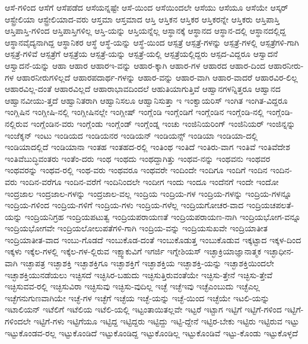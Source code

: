 {ಆಸೆ-ಗಳಿಂದ
ಆಸೆಗೆ
ಆಸೆಪಡೆದ
ಆಸೆಯನ್ನಷ್ಟೇ
ಆಸೆ-ಯಿಂದ
ಆಸೆಯಿಂದಲೇ
ಆಸೆಯು
ಆಸೆಯೂ
ಆಸೆಯೇ
ಆಸ್ಕರ್
ಆಸ್ಟ್ರೇಲಿಯಾ
ಆಸ್ಟ್ರೇಲಿಯಾದ-ವರು
ಆಸ್ತಮಾ
ಆಸ್ತಮಾದ
ಆಸ್ತಿ
ಆಸ್ತಿಕನ
ಆಸ್ತಿಕರ
ಆಸ್ತಿಕರನ್ನೇ
ಆಸ್ತಿಕರು
ಆಸ್ತಿಪಾಸ್ತಿ
ಆಸ್ತಿಪಾಸ್ತಿ-ಗಳಿಂದ
ಆಸ್ತಿಪಾಸ್ತಿಗಳಿಲ್ಲ
ಆಸ್ತಿ-ಯನ್ನು
ಆಸ್ತಿಯನ್ನೆಲ್ಲ
ಆಸ್ಥಾನಕ್ಕೆ
ಆಸ್ಥಾನದ
ಆಸ್ಥಾನ-ದಲ್ಲಿ
ಆಸ್ಥಾನದಲ್ಲಿದ್ದ
ಆಸ್ಥಾನವೈದ್ಯನಾಗಿದ್ದ
ಆಸ್ಥಾನಿಕರ
ಆಸ್ಥೆ
ಆಸ್ಥೆ-ಯನ್ನು
ಆಸ್ಥೆ-ಯಿಂದ
ಆಸ್ಪತ್ರೆ
ಆಸ್ಪತ್ರೆ-ಗಳನ್ನು
ಆಸ್ಪತ್ರೆ-ಗಳಲ್ಲಿ
ಆಸ್ಪತ್ರೆಗಳಿ-ಗಾಗಿ
ಆಸ್ಪತ್ರೆ-ಗಳಿವೆ
ಆಸ್ಪತ್ರೆಗೆ
ಆಸ್ಪತ್ರೆಯ
ಆಸ್ಪತ್ರೆ-ಯನ್ನು
ಆಸ್ಪತ್ರೆ-ಯಲ್ಲಿ
ಆಸ್ಪತ್ರೆಯಲ್ಲಿದ್ದರು
ಆಸ್ಪದ-ವಿದ್ದರೂ
ಆಸ್ವಾದನೆ
ಆಸ್ವಾದನೆ-ಯನ್ನು
ಆಹಾ
ಆಹಾರ
ಆಹಾರಇ-ವನ್ನು
ಆಹಾರ-ಕ್ಕಾಗಿ
ಆಹಾರ-ಗಳ
ಆಹಾರದ
ಆಹಾರ-ದಿಂದ
ಆಹಾರನೀರು-ಗಳ
ಆಹಾರನೀರುಗಳಿಲ್ಲದೆ
ಆಹಾರಪದಾರ್ಥ-ಗಳನ್ನು
ಆಹಾರ-ವನ್ನು
ಆಹಾರ-ವಾಗಿ
ಆಹಾರ-ವಾದರೆ
ಆಹಾರವಿರ-ಲಿಲ್ಲ
ಆಹಾರವಿಲ್ಲ-ದಂತೆ
ಆಹಾರವಿಲ್ಲದೆ
ಆಹಾರಾಭಾವದಿಂದಲೆ
ಆಹುತಿಯಾಗುತ್ತಿವೆ
ಆಹ್ವಾನಗಳನ್ನಿತ್ತರೂ
ಆಹ್ವಾನದ
ಆಹ್ವಾನವೀಯು-ತ್ತದೆ
ಆಹ್ವಾನಿತರಾಗಿ
ಆಹ್ವಾನಿಸಲೂ
ಆಹ್ವಾನಿಸುತ್ತಾ
ಇ
ಇಂಕ್ವಾಯರಿಸ್
ಇಂಗಿತ
ಇಂಗಿತ-ವಿದ್ದರೂ
ಇಂಗ್ಲಿಷಿನ
ಇಂಗ್ಲೀಷಿ-ನಲ್ಲಿ
ಇಂಗ್ಲೀಷಿನಲ್ಲೇ
ಇಂಗ್ಲೀಷ್
ಇಂಗ್ಲೆಂಡಿ
ಇಂಗ್ಲೆಂಡಿಗೆ
ಇಂಗ್ಲೆಂಡಿನ
ಇಂಗ್ಲೆಂಡಿ-ನಲ್ಲಿ
ಇಂಗ್ಲೆಂಡಿ-ನಲ್ಲಿರುವ
ಇಂಗ್ಲೆಂಡಿನ-ವರು
ಇಂಗ್ಲೆಂಡು
ಇಂಗ್ಲೆಂಡ್
ಇಂಗ್ಲೆಂಡ್ನ
ಇಂಚು
ಇಂಜಿನಿಯರಿಂಗ್
ಇಂಜಿನಿಯರ್
ಇಂಜಿನ್ನನ್ನು
ಇಂಜೆಕ್ಶನ್
ಇಂಟು
ಇಂಡಿಯದ
ಇಂಡಿಯನರ
ಇಂಡಿಯನ್
ಇಂಡಿಯನ್ಸ್
ಇಂಡಿಯಾ
ಇಂಡಿಯಾ-ದಲ್ಲಿ
ಇಂಡಿಯಾದಲ್ಲಿದೆ
ಇಂಡಿಯಾನಾ
ಇಂತಹ
ಇಂತಹದ-ರಲ್ಲಿ
ಇಂತಿಂಥ
ಇಂತಿದೆ
ಇಂತಿರು-ವಾಗ
ಇಂತಿವೆ
ಇಂತಿವೆದೇಶ
ಇಂತಿವೆಬುದ್ಧಿವಂತರು
ಇಂತೆಂ-ದರು
ಇಂಥ
ಇಂಥದು
ಇಂಥದ್ದಾಗಿತ್ತು
ಇಂಥವ-ನನ್ನು
ಇಂಥವನು
ಇಂಥವರ
ಇಂಥವರನ್ನು
ಇಂಥವ-ರಲ್ಲಿ
ಇಂಥ-ವರು
ಇಂಥವರೂ
ಇಂಥವರೇ
ಇಂದಿಂದೇ
ಇಂದಿಗೂ
ಇಂದಿಗೆ
ಇಂದಿನ
ಇಂದಿನ-ವರು
ಇಂದಿನ-ವರೆಗೂ
ಇಂದಿನ-ವರೆಗೆ
ಇಂದಿನಿಂದಲೇ
ಇಂದೀಗ
ಇಂದು
ಇಂದೂ
ಇಂದೆನಗೆ
ಇಂದೇ
ಇಂದೋ
ಇಂದ್ರಜಾಲ
ಇಂದ್ರಜಾಲ-ಗಳನ್ನು
ಇಂದ್ರಜಾಲ-ವಲ್ಲ
ಇಂದ್ರಿಯ
ಇಂದ್ರಿಯ-ಗಳ
ಇಂದ್ರಿಯ-ಗಳನ್ನು
ಇಂದ್ರಿಯ-ಗಳನ್ನೂ
ಇಂದ್ರಿಯ-ಗಳಿಂದ
ಇಂದ್ರಿಯ-ಗಳಿಗೆ
ಇಂದ್ರಿಯ-ಗಳು
ಇಂದ್ರಿಯ-ಗಳೆಲ್ಲ
ಇಂದ್ರಿಯಗೋಚರ-ವಾದ
ಇಂದ್ರಿಯಚಪಲತೆ-ಯನ್ನು
ಇಂದ್ರಿಯನಿಗ್ರಹ
ಇಂದ್ರಿಯಪಟುತ್ವ
ಇಂದ್ರಿಯಪರಾಯಣತೆ
ಇಂದ್ರಿಯಪರಾಯಣ-ನಾಗಿ
ಇಂದ್ರಿಯಭೋಗ-ವನ್ನೂ
ಇಂದ್ರಿಯಭೋಗವೇ
ಇಂದ್ರಿಯಲೋಲುಪತೆಗಳಿ-ಗಾಗಿ
ಇಂದ್ರಿಯ-ವನ್ನು
ಇಂದ್ರಿಯಸುಖವೇ
ಇಂದ್ರಿಯಾತೀತ
ಇಂದ್ರಿಯಾತೀತ-ವಾದ
ಇಂಬು-ಗೊಡದೆ
ಇಂಬುಕೊಡ-ದಂತೆ
ಇಂಬುಕೊಡುತ್ತ
ಇಂಬುಕೊಡುವ
ಇಕ್ಕಟ್ಟಾದ
ಇಕ್ಕಳ-ದಿಂದ
ಇಕ್ಕಳು
ಇಕ್ಕೆಲ-ಗಳಲ್ಲಿ
ಇಕ್ಕೆಲ-ಗಳ-ಲ್ಲಿರುವ
ಇಕ್ಷ್ವಾಕುವಿಗೆ
ಇಗರ್ಜಿ
ಇಗ್ನೇಶಿಯಸ್
ಇಚ್ಛಾಕ್ರಿಯಾಜ್ಞಾನಾತ್ಮಕ
ಇಚ್ಛಾಧೀನ-ವಾಗಿ
ಇಚ್ಛಾಪತ್ರ
ಇಚ್ಛಾಶಕ್ತಿ
ಇಚ್ಛಾಶಕ್ತಿಗೂ
ಇಚ್ಛಾಶಕ್ತಿಗೆ
ಇಚ್ಛಾಶಕ್ತಿಯ
ಇಚ್ಛಾಶಕ್ತಿ-ಯನ್ನು
ಇಚ್ಛಾಶಕ್ತಿಯಿಂದಲೇ
ಇಚ್ಛಾಶಕ್ತಿಯುನಡೆಯಲು
ಇಚ್ಛಿಸದೆ
ಇಚ್ಛಿಸಿರ-ಬಹುದು
ಇಚ್ಛಿಸುತ್ತಿರುವಂತೆಯೇ
ಇಚ್ಛಿಸು-ತ್ತೇನೆ
ಇಚ್ಛಿಸು-ತ್ತೇವೆ
ಇಚ್ಛಿಸುವವ-ರಲ್ಲಿ
ಇಚ್ಛಿಸುವಿರಾ
ಇಚ್ಛಿಸುವು
ಇಚ್ಛಿಸು-ವುದಿಲ್ಲ
ಇಚ್ಛೆ
ಇಚ್ಛೆಇವು
ಇಚ್ಛೆಎಂಬುದು
ಇಚ್ಛೆಎಲ್ಲ
ಇಚ್ಛೆಗನುಗುಣವಾಗಿಯೇ
ಇಚ್ಛೆ-ಗಳ
ಇಚ್ಛೆಗೆ
ಇಚ್ಛೆಯ
ಇಚ್ಛೆ-ಯನ್ನು
ಇಚ್ಛೆ-ಯಿಂದ
ಇಚ್ಛೆಯೇ
ಇಟಲಿ-ಯನ್ನು
ಇಟಾಲಿಯನ್
ಇಟೆಲಿಗೆ
ಇಟೆಲಿಯ
ಇಟೆಲಿ-ಯಲ್ಲಿ
ಇಟ್ಟಂತಾಯಿತಲ್ಲವೇ
ಇಟ್ಟರೆ
ಇಟ್ಟಾಗ
ಇಟ್ಟಿಗೆ
ಇಟ್ಟಿಗೆ-ಗಳಿಂದ
ಇಟ್ಟಿಗೆ-ಗಳಿಂದಲೇ
ಇಟ್ಟಿಗೆ-ಗಳು
ಇಟ್ಟಿಗೆಯೂ
ಇಟ್ಟಿದ್ದ
ಇಟ್ಟಿದ್ದರು
ಇಟ್ಟಿದ್ದು
ಇಟ್ಟಿ-ದ್ದೇನೆ
ಇಟ್ಟಿರ-ಬೇಕು
ಇಟ್ಟಿರು
ಇಟ್ಟಿರುವ
ಇಟ್ಟು
ಇಟ್ಟುಕೊಂಡವ-ರಲ್ಲ
ಇಟ್ಟುಕೊಂಡಿದೆ
ಇಟ್ಟುಕೊಂಡಿದ್ದ
ಇಟ್ಟುಕೊಂಡಿಲ್ಲ
ಇಟ್ಟುಕೊಂಡಿವೆ
ಇಟ್ಟು-ಕೊಂಡು
ಇಟ್ಟುಕೊಳ್ಳದೆ
}
